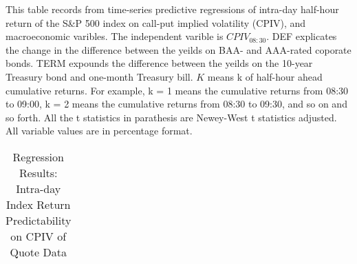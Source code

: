 \begin{table}[h]
\begin{threeparttable}
\end{threeparttable}

\end{table}




\begin{table}[h]

\caption{Regression Results: Intra-day Index Return Predictability on CPIV of Quote Data}\label{table:regression4}
\begin{threeparttable}

\medskip
\begin{spacing}{1.1}
{\scriptsize  
This table records from time-series predictive regressions of intra-day half-hour return of the S\&P 500 index on call-put implied volatility (CPIV), and macroeconomic varibles. The independent varible is $CPIV_{08:30}$. DEF explicates the change in the difference between the yeilds on BAA- and AAA-rated coporate bonds. TERM expounds the difference between the yeilds on the 10-year Treasury bond and one-month Treasury bill. $K$ means k of half-hour ahead cumulative returns. For example, k = 1 means the cumulative returns from 08:30 to 09:00, k = 2 means the cumulative returns from 08:30 to 09:30, and so on and so forth. All the t statistics in parathesis are Newey-West t statistics adjusted. All variable values are in percentage format. 
}
\end{spacing}
\medskip
\tiny

\begin{tabular}{ccccccccccccccc}
\toprule


\end{tabular}
\end{threeparttable}
\end{table}
